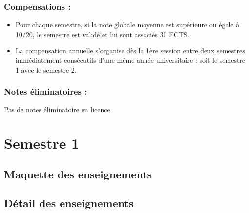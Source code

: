 \documentclass[10pt, a5paper]{report}
\begin{document}
\begin{spacing}{1.5}
\subsubsection*{Compensations :}

\begin{itemize}
\item Pour chaque semestre, si la note globale moyenne est supérieure ou égale à 10/20, le semestre est validé et lui sont associés 30 ECTS.
\item La compensation annuelle s'organise dès la 1ère session entre deux semestres immédiatement consécutifs d'une même année universitaire : soit le semestre 1 avec le semestre 2.
\end{itemize}

\subsubsection*{Notes éliminatoires :}

Pas de notes éliminatoire en licence

\newpage
\section*{Semestre 1}
\subsection*{Maquette des enseignements}



\subsection*{Détail des enseignements}

\end{spacing}
\end{document}
